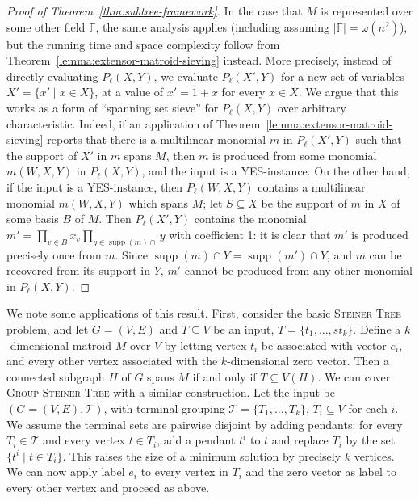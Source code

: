 \documentclass[10pt,a4paper]{article}
\newcommand{\F}{\ensuremath{\mathbb F}\xspace}
\newcommand{\cT}{\ensuremath{\mathcal T}\xspace}
\DeclareMathOperator{\supp}{supp}
\begin{document}
\begin{proof}[Proof of Theorem~\ref{thm:subtree-framework}]
  In the case that $M$ is represented over some other field $\F$, the same
  analysis applies (including assuming $|\F| = \omega(n^2)$), but the 
  running time and space complexity follow from
  Theorem~\ref{lemma:extensor-matroid-sieving} instead.
  More precisely, instead of directly evaluating $P_\ell(X,Y)$,
  we evaluate $P_\ell(X',Y)$ for a new set of variables $X'=\{x' \mid x \in X\}$,
  at a value of $x'=1+x$ for every $x \in X$. We argue that 
  this works as a form of ``spanning set sieve'' for $P_\ell(X,Y)$
  over arbitrary characteristic. Indeed, if an application
  of Theorem~\ref{lemma:extensor-matroid-sieving} reports that
  there is a multilinear monomial $m$ in $P_\ell(X',Y)$ such that the support
  of $X'$ in $m$ spans $M$, then $m$ is produced from some monomial
  $m(W,X,Y)$ in $P_\ell(X,Y)$, and the input is a YES-instance.
  On the other hand, if the input is a YES-instance, then 
  $P_\ell(W,X,Y)$ contains a multilinear monomial $m(W,X,Y)$
  which spans $M$; let $S \subseteq X$ be the support of $m$ in $X$
  of some basis $B$ of $M$. Then $P_\ell(X',Y)$ contains the monomial
  $m'=\prod_{v \in B} x_v \prod_{y \in \supp(m) \cap} y$ with coefficient 1:
  it is clear that $m'$ is produced precisely once from $m$. 
  Since $\supp(m) \cap Y = \supp(m') \cap Y$, and $m$ can be recovered from
  its support in $Y$, $m'$ cannot be produced from any other
  monomial in $P_\ell(X,Y)$. 
\end{proof}

We note some applications of this result. First, consider the basic
\textsc{Steiner Tree} problem, and let $G=(V,E)$ and $T \subseteq V$
be an input, $T=\{t_1,\ldots,st_k\}$. Define a $k$-dimensional matroid
$M$ over $V$ by letting vertex $t_i$ be associated with vector $e_i$,
and every other vertex associated with the $k$-dimensional zero
vector. Then a connected subgraph $H$ of $G$ spans $M$ if and only if
$T \subseteq V(H)$. We can cover \textsc{Group Steiner Tree} with a
similar construction. Let the input be $(G=(V,E), \cT)$, with
terminal grouping $\cT=\{T_1,\ldots,T_k\}$, $T_i \subseteq V$ for each $i$.
We assume the terminal sets are pairwise disjoint by adding pendants:
for every $T_i \in \cT$ and every vertex $t \in T_i$, add a pendant
$t^i$ to $t$ and replace $T_i$ by the set $\{t^i \mid t \in T_i\}$. 
This raises the size of a minimum solution by precisely $k$ vertices.
We can now apply label $e_i$ to every vertex in $T_i$ and the zero vector
as label to every other vertex and proceed as above.
\end{document}
